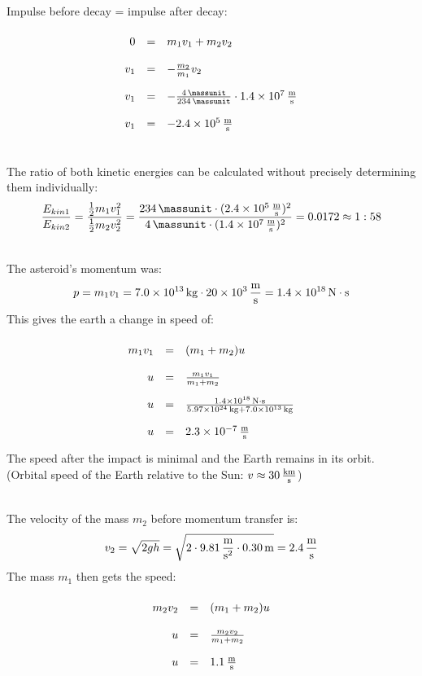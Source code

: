 \documentclass[a4paper]{article}
\begin{document}
	\\
	Impulse before decay = impulse after decay:
	$$
	\renewcommand{\arraystretch}{2}
	\begin{array}{rcll}
		0 &=& m_1v_1 + m_2v_2 \\
		v_1 &=& - {m_2 \over m_1}v_2 \\
		v_1 &=& -{\SI{4}{\massunit} \over \SI{234}{\massunit}} \cdot\SI{1,4e7}{\meter\over \second}\\
		v_1 &=& \SI{-2,4e5}{\meter\over \second}
	\end{array}
	$$
	\vspace{0.5 cm}
	
	\\
	The ratio of both kinetic energies can be calculated without precisely determining them individually:
	$$
	{E_{kin1}\over E_{kin2}}= {{1 \over 2}m_1v_1^2 \over {1 \over 2} m_2v_2^2} = { \SI{234}{\massunit} \cdot (\SI{2,4e5}{\meter\over \second})^2 \over \SI{4}{\massunit}\cdot (\SI {1.4e7}{\meter\over\second})^2}=0.0172 \approx 1 : 58$$
	\vspace{0.5 cm}
	
	\\
	The asteroid's momentum was:
	$$p=m_1v_1=\SI{7,0e13}{\kilogram} \cdot \SI{20e3}{\meter\over \second} = \SI{1,4e18}{\newton\cdot\second}$$
	This gives the earth a change in speed of:
	$$
	\renewcommand{\arraystretch}{2}
	\begin{array}{rcll}
		m_1v_1 &=& (m_1+m_2)u \\
		u &=& {m_1v_1 \over m_1+m_2}\\
		u &=& {\SI{1.4e18}{\newton\cdot\second}\over\SI{5.97e24}{\kilogram} +\SI{7.0e13}{\kilogram}}\\
		u &=& \SI{2,3e-7}{\meter\over \second}
	\end{array}
	$$
	The speed after the impact is minimal and the Earth remains in its orbit.
	(Orbital speed of the Earth relative to the Sun: $v \approx \SI{30}{\kilo\meter\over \second}$)
	\vspace{0.5 cm}
	
	\\
	The velocity of the mass $m_2$ before momentum transfer is:
	$$v_2 = \sqrt{2gh} = \sqrt{2\cdot \SI{9.81}{\meter \over {\second^2}} \cdot \SI{0.30}{\meter}}=\SI {2,4}{\meter\over \second}$$
	The mass $m_1$ then gets the speed:
	$$
	\renewcommand{\arraystretch}{2}
	\begin{array}{rcll}
		m_2v_2 &=& (m_1+m_2)u \\
		u &=& {m_2v_2 \over m_1 + m_2} \\
		u &=& \SI{1,1}{\meter\over\second}
	\end{array}
	$$
	\vspace{0.5 cm}
	
\end{document}
